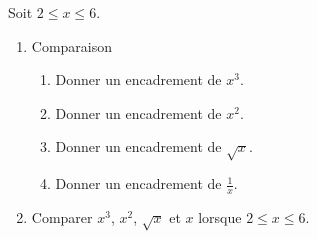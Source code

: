 
Soit $2 \leq x \leq 6$.
 \begin{enumerate}
 \item Comparaison
 \begin{enumerate}
 \item Donner un encadrement de $x^3$.
  \item Donner un encadrement de $x^2$.
 \item Donner un encadrement de $\sqrt{x}$.
  \item Donner un encadrement de $\frac{1}{x}$.
 \end{enumerate}
\item  Comparer $x^3$, $x^2$, $\sqrt{x}$ et $x$ lorsque $2 \leq x \leq 6$.
 \end{enumerate}